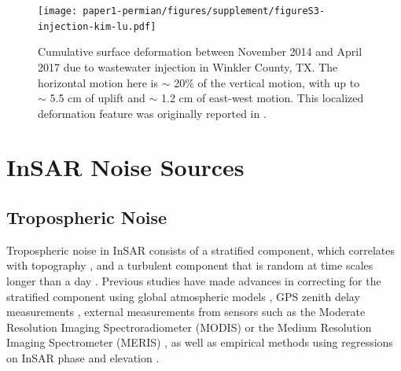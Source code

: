 \documentclass{utexasthesis}
\begin{document}
\begin{figure}
	\centering
	\texttt{[image: paper1-permian/figures/supplement/figureS3-injection-kim-lu.pdf]}
	\caption[Vertical and horizontal deformation near Winkler County, TX]{Cumulative surface deformation between November 2014 and April 2017 due to wastewater injection in Winkler County, TX. The horizontal motion here is $\sim$ 20\% of the vertical motion, with up to $\sim$ 5.5 cm of uplift and $\sim$ 1.2 cm of east-west motion. This localized deformation feature was originally reported in \cite{Kim2018AssociationLocalizedGeohazards}.}
	\label{fig:injection-kim-lu}
\end{figure}





\section{InSAR Noise Sources}
\label{ch3-noise}

\subsection{Tropospheric Noise}
\label{ch3-noise-tropo}

Tropospheric noise in InSAR consists of a stratified component, which correlates with topography \citep{Doin2009CorrectionsStratifiedTropospheric}, and a turbulent component that is random at time scales longer than a day \citep{Emardson2003NeutralAtmosphericDelay, Onn2006ModelingWaterVapor}. Previous studies have made advances in correcting for the stratified component using global atmospheric models \citep{Doin2009CorrectionsStratifiedTropospheric, Jolivet2014ImprovingInsarGeodesy, Cao2021AdvancedInsarTropospheric}, GPS zenith delay measurements \citep{Onn2006ModelingWaterVapor}, external measurements from sensors such as the Moderate Resolution Imaging Spectroradiometer (MODIS) \citep{Li2005InterferometricSyntheticAperture, Barnhart2013CharacterizingEstimatingNoise} or the Medium Resolution Imaging Spectrometer (MERIS)  \citep{Ding2008AtmosphericEffectsInsar}, as well as empirical methods using regressions on InSAR phase and elevation \citep{Zebker2021AccuracyModelFree, Murray2021ClusterBasedEmpirical}.
\end{document}
